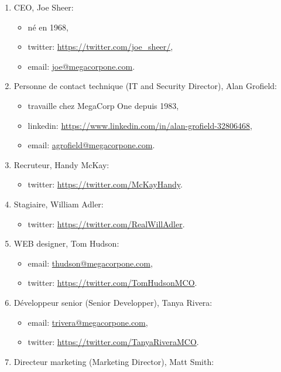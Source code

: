 \documentclass[french,oneside]{article}
\begin{document}
\begin{enumerate}
    \item CEO, Joe Sheer:
    \begin{itemize}
        \item né en 1968,
        \item twitter: \url{https://twitter.com/joe\_sheer/},
        \item email: \url{joe@megacorpone.com}.
    \end{itemize}
    \item Personne de contact technique (IT and Security Director), Alan Grofield:
    \begin{itemize}
        \item travaille chez MegaCorp One depuis 1983,
        \item linkedin: \url{https://www.linkedin.com/in/alan-grofield-32806468},
        \item email: \url{agrofield@megacorpone.com}.
    \end{itemize}
    \item Recruteur, Handy McKay:
    \begin{itemize}
        \item twitter: \url{https://twitter.com/McKayHandy}.
    \end{itemize}
    \item Stagiaire, William Adler:
    \begin{itemize}
        \item twitter: \url{https://twitter.com/RealWillAdler}.
    \end{itemize}
    \item WEB designer, Tom Hudson:
    \begin{itemize}
        \item email: \url{thudson@megacorpone.com},
        \item twitter: \url{https://twitter.com/TomHudsonMCO}.
    \end{itemize}
    \item Développeur senior (Senior Developper), Tanya Rivera:
    \begin{itemize}
        \item email: \url{trivera@megacorpone.com},
        \item twitter: \url{https://twitter.com/TanyaRiveraMCO}.
    \end{itemize}
    \item Directeur marketing (Marketing Director), Matt Smith:
    \begin{itemize}

\end{itemize}
\end{enumerate}
\end{document}
